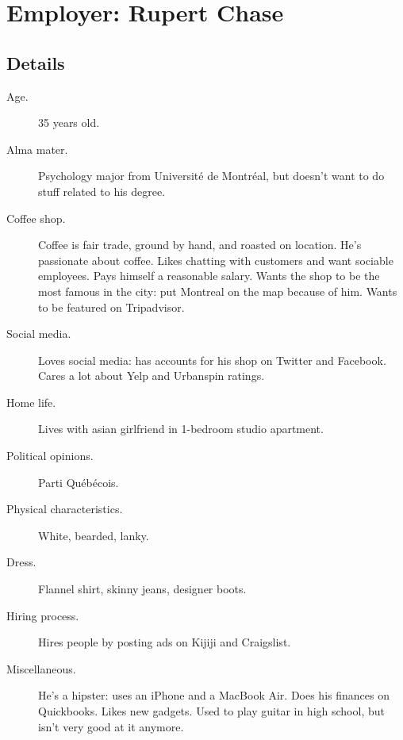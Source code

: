 \documentclass{article}
\begin{document}
\section{Employer: Rupert Chase}

\subsection{Details}

\begin{description}
    \item[Age.]
        35 years old.

    \item[Alma mater.]
        Psychology major from Universit\'e de Montr\'eal, but doesn't want to
        do stuff related to his degree.

    \item[Coffee shop.]
        Coffee is fair trade, ground by hand, and roasted on location. He's
        passionate about coffee. Likes chatting with customers and want
        sociable employees. Pays himself a reasonable salary.  Wants the shop
        to be the most famous in the city: put Montreal on the map because of
        him. Wants to be featured on Tripadvisor.

    \item[Social media.]
        Loves social media: has accounts for his shop on Twitter and Facebook. Cares a lot about Yelp and Urbanspin ratings.

    \item[Home life.]
        Lives with asian girlfriend in 1-bedroom studio apartment.

    \item[Political opinions.]
        Parti Qu\'eb\'ecois.

    \item[Physical characteristics.]
        White, bearded, lanky.

    \item[Dress.]
        Flannel shirt, skinny jeans, designer boots.

    \item[Hiring process.]
        Hires people by posting ads on Kijiji and Craigslist.

    \item[Miscellaneous.]
        He's a hipster: uses an iPhone and a MacBook Air. Does his finances on
        Quickbooks. Likes new gadgets. Used to play guitar in high school, but
        isn't very good at it anymore.
\end{description}
\end{document}
